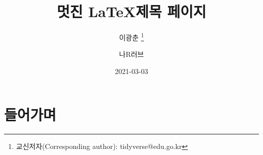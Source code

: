 \documentclass[]{article}
\title{멋진 \LaTeX 제목 페이지}
\author{이광춘 \thanks{교신저자(Corresponding author): tidyverse@edu.go.kr}}
\author[2]{나R러브}
\date{2021-03-03}
\affil{Tidyverse Korea}
\affil[2]{Seoul R Meetup}
\begin{document}
\maketitle

\begin{abstract}
 	\jiwon[1]
\end{abstract}

\section{들어가며}
	\jiwon
\end{document}
